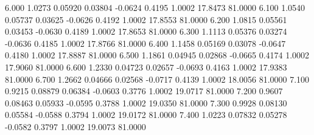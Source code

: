   6.000   1.0273   0.05920   0.03804  -0.0624   0.4195   1.0002  17.8473  81.0000
   6.100   1.0540   0.05737   0.03625  -0.0626   0.4192   1.0002  17.8553  81.0000
   6.200   1.0815   0.05561   0.03453  -0.0630   0.4189   1.0002  17.8653  81.0000
   6.300   1.1113   0.05376   0.03274  -0.0636   0.4185   1.0002  17.8766  81.0000
   6.400   1.1458   0.05169   0.03078  -0.0647   0.4180   1.0002  17.8887  81.0000
   6.500   1.1861   0.04945   0.02868  -0.0665   0.4174   1.0002  17.9060  81.0000
   6.600   1.2330   0.04723   0.02657  -0.0693   0.4163   1.0002  17.9383  81.0000
   6.700   1.2662   0.04666   0.02568  -0.0717   0.4139   1.0002  18.0056  81.0000
   7.100   0.9215   0.08879   0.06384  -0.0603   0.3776   1.0002  19.0717  81.0000
   7.200   0.9607   0.08463   0.05933  -0.0595   0.3788   1.0002  19.0350  81.0000
   7.300   0.9928   0.08130   0.05584  -0.0588   0.3794   1.0002  19.0172  81.0000
   7.400   1.0223   0.07832   0.05278  -0.0582   0.3797   1.0002  19.0073  81.0000
